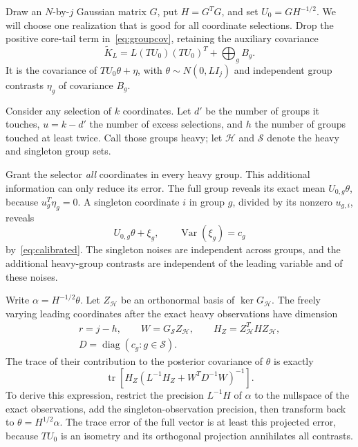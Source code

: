 \documentclass[11pt]{article}
\theoremstyle{remark}\newtheorem{remark}[theorem]{Remark}
\newcommand{\tr}{\operatorname{tr}}
\newcommand{\diag}{\operatorname{diag}}
\begin{document}
Draw an $N$-by-$j$ Gaussian matrix $G$, put $H=G^TG$, and set $U_0=GH^{-1/2}$. We will choose one realization that is good for all coordinate selections. Drop the positive core-tail term in~\eqref{eq:groupcov}, retaining the auxiliary covariance
\begin{equation}\label{eq:auxgroup}
 \widetilde K_L=L(TU_0)(TU_0)^T+\bigoplus_g B_g.
\end{equation}
It is the covariance of $TU_0\theta+\eta$, with $\theta\sim N(0,L I_j)$ and independent group contrasts $\eta_g$ of covariance $B_g$.

Consider any selection of $k$ coordinates. Let $d'$ be the number of groups it touches, $u=k-d'$ the number of excess selections, and $h$ the number of groups touched at least twice. Call those groups heavy; let $\mathcal H$ and $\mathcal S$ denote the heavy and singleton group sets.

Grant the selector \emph{all} coordinates in every heavy group. This additional information can only reduce its error. The full group reveals its exact mean $U_{0,g}\theta$, because $u_g^T\eta_g=0$. A singleton coordinate $i$ in group $g$, divided by its nonzero $u_{g,i}$, reveals
\[
 U_{0,g}\theta+\xi_g,\qquad \operatorname{Var}(\xi_g)=c_g
\]
by~\eqref{eq:calibrated}. The singleton noises are independent across groups, and the additional heavy-group contrasts are independent of the leading variable and of these noises.

Write $\alpha=H^{-1/2}\theta$. Let $Z_{\mathcal H}$ be an orthonormal basis of $\ker G_{\mathcal H}$. The freely varying leading coordinates after the exact heavy observations have dimension
\[
 \begin{gathered}
 r=j-h,\qquad W=G_{\mathcal S}Z_{\mathcal H},\qquad
 H_Z=Z_{\mathcal H}^T H Z_{\mathcal H},\\
 D=\diag(c_g:g\in\mathcal S).
 \end{gathered}
\]
The trace of their contribution to the posterior covariance of $\theta$ is exactly
\begin{equation}\label{eq:posterior}
 \tr\left[H_Z\left(L^{-1}H_Z+W^TD^{-1}W\right)^{-1}\right].
\end{equation}
To derive this expression, restrict the precision $L^{-1}H$ of $\alpha$ to the nullspace of the exact observations, add the singleton-observation precision, then transform back to $\theta=H^{1/2}\alpha$. The trace error of the full vector is at least this projected error, because $TU_0$ is an isometry and its orthogonal projection annihilates all contrasts.
\end{document}
